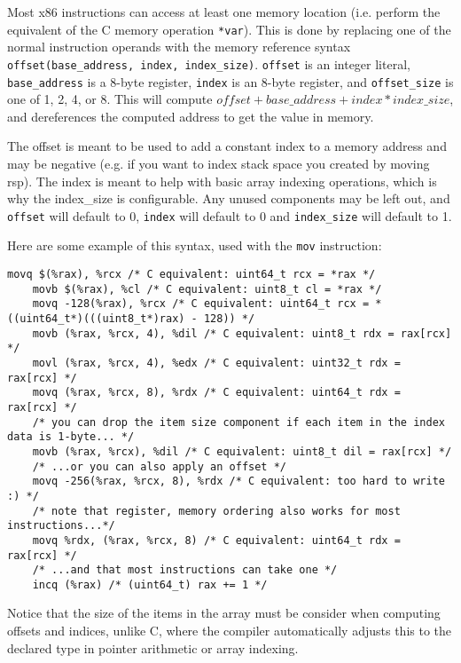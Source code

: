 \documentclass[11pt]{article}
\begin{document}
Most x86 instructions can access at least one memory location (i.e. perform the equivalent
of the C memory operation \texttt{*var}). This is done by replacing one of the normal
instruction operands with the memory reference syntax \texttt{offset(base\_address,
index, index\_size)}. \texttt{offset} is an integer literal, \texttt{base\_address} is a
8-byte register, \texttt{index} is an 8-byte register, and \texttt{offset\_size} is one of
1, 2, 4, or 8. This will compute $offset + base\_address + index * index\_size$, and
dereferences the computed address to get the value in memory.

The offset is meant to be used to add a constant index to a memory address and may be
negative (e.g. if you want to index stack space you created by moving rsp). The index is
meant to help with basic array indexing operations, which is why the index\_size is
configurable. Any unused components may be left out, and \texttt{offset} will default to
0, \texttt{index} will default to 0 and \texttt{index\_size} will default to 1.

Here are some example of this syntax, used with the \texttt{mov} instruction:

\begin{lstlisting}[caption={Accessing memory references}, captionpos=b]
    movq $(%rax), %rcx /* C equivalent: uint64_t rcx = *rax */
    movb $(%rax), %cl /* C equivalent: uint8_t cl = *rax */
    movq -128(%rax), %rcx /* C equivalent: uint64_t rcx = *((uint64_t*)(((uint8_t*)rax) - 128)) */
    movb (%rax, %rcx, 4), %dil /* C equivalent: uint8_t rdx = rax[rcx] */
    movl (%rax, %rcx, 4), %edx /* C equivalent: uint32_t rdx = rax[rcx] */
    movq (%rax, %rcx, 8), %rdx /* C equivalent: uint64_t rdx = rax[rcx] */
    /* you can drop the item size component if each item in the index data is 1-byte... */
    movb (%rax, %rcx), %dil /* C equivalent: uint8_t dil = rax[rcx] */
    /* ...or you can also apply an offset */
    movq -256(%rax, %rcx, 8), %rdx /* C equivalent: too hard to write :) */
    /* note that register, memory ordering also works for most instructions...*/
    movq %rdx, (%rax, %rcx, 8) /* C equivalent: uint64_t rdx = rax[rcx] */
    /* ...and that most instructions can take one */
    incq (%rax) /* (uint64_t) rax += 1 */
\end{lstlisting}

Notice that the size of the items in the array must be consider when computing offsets
and indices, unlike C, where the compiler automatically adjusts this to the declared type
in pointer arithmetic or array indexing.
\end{document}
